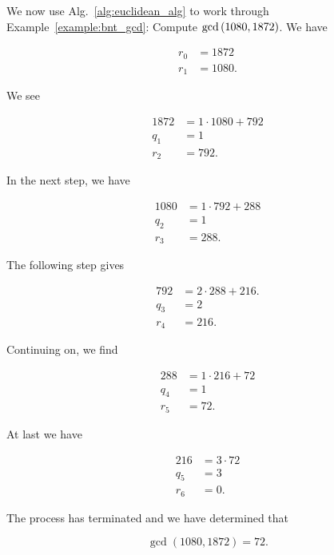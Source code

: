 \begin{example}
\label{example:app_math_euclidean_alg}

We now use Alg.~\ref{alg:euclidean_alg}
to work through Example~\ref{example:bnt_gcd}:
Compute $\gcd\left( 1080,1872 \right)$.
We have

\begin{align}
    r_{0} &= 1872 \nonumber\\
    r_{1} &= 1080.
\end{align}

\noindent
We see

\begin{align}
    1872 &= 1\cdot1080 + 792
        \nonumber\\
    q_{1} &= 1
        \nonumber\\
    r_{2} &= 792.
\end{align}

\noindent
In the next step, we have

\begin{align}
    1080 &= 1\cdot792 + 288
        \nonumber\\
    q_{2} &= 1
        \nonumber\\
    r_{3} &= 288.
\end{align}

\noindent
The following step gives

\begin{align}
    792 &= 2\cdot288 + 216.
        \nonumber\\
    q_{3} &= 2
        \nonumber\\
    r_{4} &= 216.
\end{align}

\noindent
Continuing on, we find

\begin{align}
    288 &= 1\cdot216 + 72
        \nonumber\\
    q_{4} &= 1
        \nonumber\\
    r_{5} &= 72.
\end{align}

\noindent
At last we have

\begin{align}
    216 &= 3\cdot 72
        \nonumber\\
    q_{5} &= 3
        \nonumber\\
    r_{6} &= 0.
\end{align}

\noindent
The process has terminated and we have determined that

\begin{equation}
    \gcd(1080,1872) = 72.
\end{equation}
\end{example}


